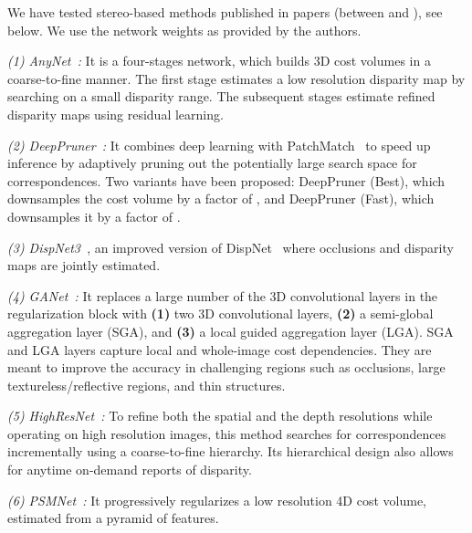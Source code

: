 \documentclass[10pt,journal,compsoc]{IEEEtran}
\newcommand{\noi}{\noindent}
\begin{document}
We have tested  stereo-based methods published in  papers (between  and ), see below. We use the network weights  as provided by the authors. 

\vspace{6pt}
\noi\textit{(1) AnyNet~\cite{wang2019anytime}:} It is a four-stages network, which builds 3D cost volumes in a coarse-to-fine manner.  The first stage estimates a low resolution disparity map by searching on a small disparity range.  The subsequent stages estimate refined disparity maps using residual learning.



\vspace{6pt}
\noi\textit{(2) DeepPruner~\cite{Duggal_2019_ICCV}:}  It combines deep learning with PatchMatch~\cite{barnes2009patchmatch} to speed up inference by adaptively pruning out the potentially large search space for correspondences. Two variants have been proposed: DeepPruner (Best), which downsamples the cost volume by a factor of , and   DeepPruner (Fast), which  downsamples it by a factor of .
	
\vspace{6pt}
\noi\textit{(3) DispNet3~\cite{Ilg_2018_ECCV}}, an improved version of DispNet~\cite{mayer2016large} where occlusions and disparity maps are jointly estimated. 
	
\vspace{6pt}
\noi\textit{(4) GANet~\cite{zhang2019ga}: } It replaces a large number of the 3D convolutional layers in the regularization block with \textbf{(1)} two 3D convolutional layers, \textbf{(2)} a semi-global aggregation layer  (SGA), and \textbf{(3)} a  local guided aggregation layer (LGA).  SGA and LGA layers capture local and  whole-image cost dependencies. They are meant to  improve the accuracy  in challenging regions such as occlusions, large textureless/reflective regions, and thin structures. 
	
\vspace{6pt}
\noi\textit{(5) HighResNet~\cite{Yang_2019_CVPR}:} To  refine both the spatial and the depth resolutions while operating on high resolution images, this method searches for correspondences incrementally using a coarse-to-fine hierarchy.  Its hierarchical design  also allows for anytime on-demand reports of disparity. 
	
\vspace{6pt}
\noi\textit{(6)  PSMNet~\cite{chang2018pyramid}:} It  progressively regularizes a low resolution 4D cost volume, estimated from a pyramid of features. 
	
\end{document}
